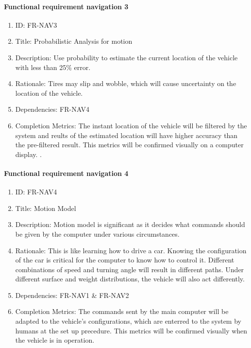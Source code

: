 \documentclass[compsoc,draftclsnofoot,onecolumn,10pt]{IEEEtran}
\begin{document}
	\paragraph{Functional requirement navigation 3}
		\begin{enumerate}
			\item ID: FR-NAV3
			\item Title: Probabilistic Analysis for motion
			\item Description: Use probability to estimate the current location of the vehicle with less than 25\% error.
			\item Rationale: Tires may slip and wobble, which will cause uncertainty on the location of the vehicle.
			\item Dependencies: FR-NAV4
			\item Completion Metrics: The instant location of the vehicle will be filtered by the system and reults of the estimated 
			location will have higher accuracy than the pre-filtered result. This metrics will be confirmed visually on
			a computer display. . 
		\end{enumerate}

	\paragraph{Functional requirement navigation 4}
		\begin{enumerate}
			\item ID: FR-NAV4
			\item Title: Motion Model
			\item Description: Motion model is significant as it decides what commands should be given by the computer under various circumstances.
			\item Rationale: This is like learning how to drive a car. Knowing the configuration of the car is critical for the computer to know how to control it. Different combinations of speed and turning angle will result in different paths. Under different surface and weight distributions, the vehicle will also act differently.
			\item Dependencies: FR-NAV1 \& FR-NAV2
			\item Completion Metrics: The commands sent by the main computer will be adapted to the vehicle's configurations, which are enterred to the 
			system by humans at the set up precedure. This metrics will be confirmed visually when the vehicle is in operation.  
		\end{enumerate} 
\end{document}
